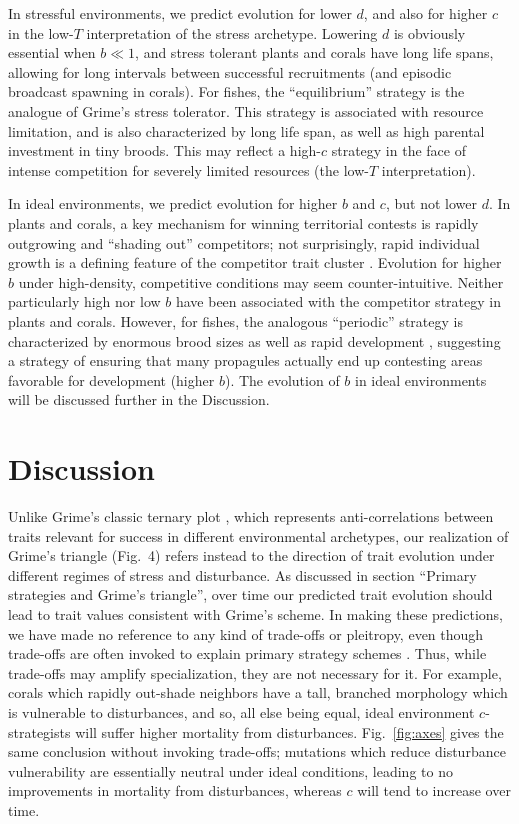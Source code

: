 \documentclass[11pt]{article}
\begin{document}
In stressful environments, we predict evolution for lower $d$, and also  for higher $c$ in the low-$T$ interpretation of the stress archetype. Lowering $d$ is obviously essential when $b\ll 1$, and stress tolerant plants and corals have long life spans, allowing for long intervals between successful recruitments (and episodic broadcast spawning in corals). For fishes, the ``equilibrium'' strategy is the analogue of Grime's stress tolerator. This strategy is associated with resource limitation, and is also characterized by long life span, as well as high parental investment in tiny broods. This may reflect a high-$c$ strategy in the face of intense competition for severely limited resources (the low-$T$ interpretation).

In ideal environments, we predict evolution for higher $b$ and $c$, but not lower $d$. In plants and corals, a key mechanism for winning territorial contests is rapidly outgrowing and ``shading out'' competitors; not surprisingly, rapid individual growth is a defining feature of the competitor trait cluster \citep{grime_1977,darling_2012}. Evolution for higher $b$ under high-density, competitive conditions may seem counter-intuitive. Neither particularly high nor low $b$ have been associated with the competitor strategy in plants and corals. However, for fishes, the analogous ``periodic'' strategy is characterized by enormous brood sizes as well as rapid development \citep{winemiller_1992,winemiller_2015}, suggesting a strategy of ensuring that many propagules actually end up contesting areas favorable for development (higher $b$). The evolution of $b$ in ideal environments will be discussed further in the Discussion.

\section*{Discussion}

Unlike Grime's classic ternary plot \citep{grime_1974}, which represents anti-correlations between traits relevant for success in different environmental archetypes, our realization of Grime's triangle (Fig.~4) refers instead to the direction of trait evolution under different regimes of stress and disturbance. As discussed in section ``Primary strategies and Grime's triangle'', over time our predicted trait evolution should lead to trait values consistent with Grime's scheme. In making these predictions, we have made no reference to any kind of trade-offs or pleitropy, even though trade-offs are often invoked to explain primary strategy schemes \citep{macarthur_1962,winemiller_1992,aerts_1999}. Thus, while trade-offs may amplify specialization, they are not necessary for it. For example, corals which rapidly out-shade neighbors have a tall, branched morphology which is vulnerable to disturbances, and so, all else being equal, ideal environment $c$-strategists will suffer higher mortality from disturbances. Fig.~\ref{fig:axes} gives the same conclusion without invoking trade-offs; mutations which reduce disturbance vulnerability are essentially neutral under ideal conditions, leading to no improvements in mortality from disturbances, whereas $c$ will tend to increase over time. 
\end{document}

